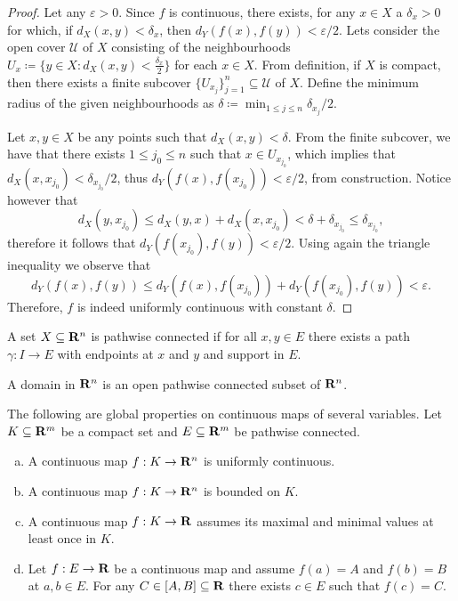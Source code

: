 \begin{proof}
Let any \(\varepsilon > 0\). Since \(f\) is continuous, there exists, for any
\(x \in X\) a \(\delta_x > 0\) for which, if \(d_X(x, y) < \delta_x\), then
\(d_Y(f(x), f(y)) < \varepsilon/2\). Lets consider the open cover \(\mathcal U\)
of \(X\) consisting of the neighbourhoods \(U_x \coloneq \{y \in X : d_{X}(x, y)
< \frac {\delta_{x}} 2\}\) for each \(x \in X\). From definition, if \(X\) is
compact, then there exists a finite subcover \(\{U_{x_j}\}_{j=1}^n \subseteq
\mathcal U\) of \(X\). Define the minimum radius of the given neighbourhoods as
\(\delta \coloneq \min_{1 \leq j \leq n} \delta_{x_j}/2\).

Let \(x, y \in X\) be any points such that \(d_X(x, y) < \delta\). From the
finite subcover, we have that there exists \(1 \leq j_0 \leq n\) such that \(x
\in U_{x_{j_0}}\), which implies that \(d_X(x, x_{j_0}) < \delta_{x_{j_0}}/2\),
thus \(d_Y(f(x), f(x_{j_0})) < \varepsilon/2\), from construction. Notice however
that
\[
  d_X(y, x_{j_0}) \leq d_X(y, x) + d_X(x, x_{j_0})
  < \delta + \delta_{x_{j_0}}
  \leq \delta_{x_{j_0}},
\]
therefore it follows that \(d_Y(f(x_{j_0}), f(y)) < \varepsilon/2\). Using again
the triangle inequality we observe that
\[
  d_Y(f(x), f(y)) \leq d_Y(f(x), f(x_{j_0})) + d_Y(f(x_{j_0}), f(y))
  < \varepsilon.
\]
Therefore, \(f\) is indeed uniformly continuous with constant \(\delta\).
\end{proof}

\begin{definition}\label{def: path-connected}
A set \(X \subseteq \mathbf{R}^n\) is pathwise connected if for all \(x, y \in E\)
there exists a path \(\gamma: I \to E\) with endpoints at \(x\) and \(y\) and
support in \(E\).
\end{definition}

\begin{definition}[Domain]\label{def: domain}
A domain in \(\mathbf{R}^n\) is an open pathwise connected subset of \(\mathbf{R}^n\).
\end{definition}

\begin{proposition}
\label{prop:global-properties-continuous-on-compact}
The following are global properties on continuous maps of several
variables. Let \(K \subseteq \mathbf{R}^m\) be a compact set and \(E \subseteq \mathbf{R}^m\)
be pathwise connected.
\begin{enumerate}[(a)]
\item A continuous map \(f: K \to \mathbf{R}^n\) is uniformly continuous.
\item A continuous map \(f: K \to \mathbf{R}^n\) is bounded on \(K\).
\item A continuous map \(f: K \to \mathbf{R}\) assumes its maximal and minimal
    values at least once in \(K\).
\item Let \(f: E \to \mathbf{R}\) be a continuous map and assume \(f(a) = A\) and
    \(f(b) = B\) at \(a, b \in E\). For any \(C \in [A, B] \subseteq \mathbf{R}\)
    there exists \(c \in E\) such that \(f(c) = C\).
\end{enumerate}
\end{proposition}

